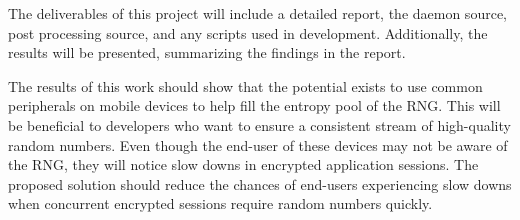 
The deliverables of this project will include a detailed report, the 
daemon source, post processing source, and any scripts used in 
development. Additionally, the results will be presented, summarizing 
the findings in the report.  

The results of this work should show that the potential exists to use 
common peripherals on mobile devices to help fill the entropy pool of 
the RNG. This will be beneficial to developers who want to ensure a 
consistent stream of high-quality random numbers. Even though the 
end-user of these devices may not be aware of the RNG, they will notice 
slow downs in encrypted application sessions. The proposed solution 
should reduce the chances of end-users experiencing slow downs when 
concurrent encrypted sessions require random numbers quickly.
